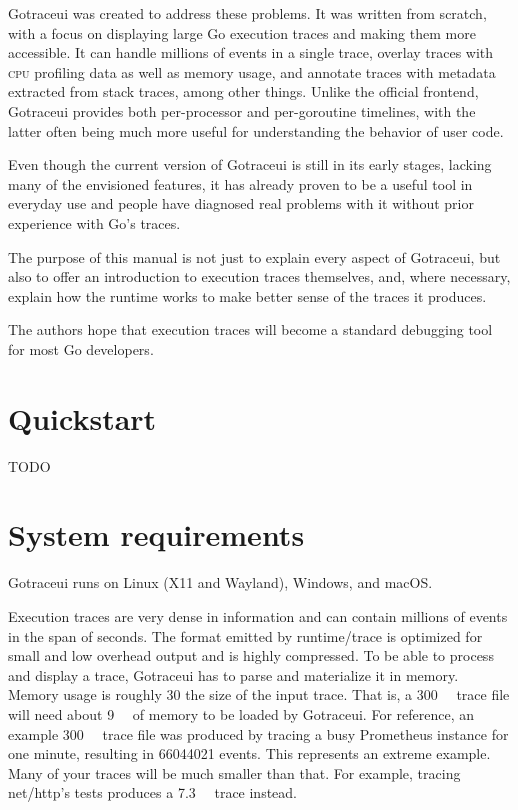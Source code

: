 \documentclass[10pt,letterpaper,oneside,openany,english]{memoir}
\newcommand{\code}[1]{{\ttfamily\mbox{#1}}}
\newcommand{\todo}[1]{{\color{red}#1}}
\begin{document}
Gotraceui was created to address these problems.
It was written from scratch, with a focus on displaying large Go execution traces and making them more accessible.
It can handle millions of events in a single trace, overlay traces with \textsc{cpu} profiling data as well as memory usage,
and annotate traces with metadata extracted from stack traces, among other things.
Unlike the official frontend, Gotraceui provides both per-processor and per-goroutine timelines,
with the latter often being much more useful for understanding the behavior of user code.

Even though the current version of Gotraceui is still in its early stages,
lacking many of the envisioned features,
it has already proven to be a useful tool in everyday use
and people have diagnosed real problems with it without prior experience with Go's traces.

The purpose of this manual is not just to explain every aspect of Gotraceui,
but also to offer an introduction to execution traces themselves,
and, where necessary, explain how the runtime works to make better sense of the traces it produces.

The authors hope that execution traces will become a standard debugging tool for most Go developers.

\chapter{Quickstart}

\todo{TODO}

\chapter{System requirements}

Gotraceui runs on Linux (X11 and Wayland), Windows, and macOS.

Execution traces are very dense in information and can contain millions of events in the span of seconds.
The format emitted by \code{runtime/trace} is optimized for small and low overhead output and is highly compressed.
To be able to process and display a trace, Gotraceui has to parse and materialize it in memory.
Memory usage is roughly 30\texttimes{} the size of the input trace.
That is, a \qty{300}{\mega\byte} trace file will need about \qty{9}{\giga\byte} of memory to be loaded by Gotraceui.
For reference, an example \qty{300}{\mega\byte} trace file was produced by tracing a busy Prometheus instance for one minute,
resulting in \num{66044021} events.
This represents an extreme example.
Many of your traces will be much smaller than that.
For example, tracing \code{net/http}'s tests produces a \qty{7.3}{\mega\byte} trace instead. 
\end{document}

